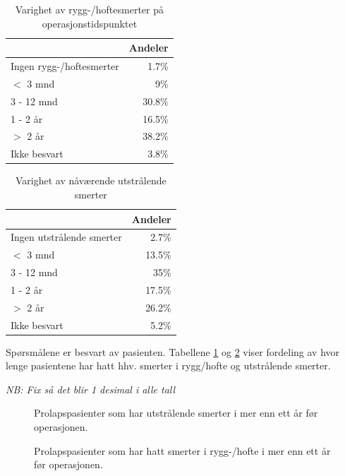 \documentclass [norsk,a4paper,twoside]{article}\usepackage[]{graphicx}\usepackage[]{color}
\begin{document}
\begin{table}[ht]
\centering
\begin{tabular}{lr}
  \hline
 & Andeler \\ 
  \hline
Ingen rygg-/hoftesmerter & 1.7\% \\ 
  $<$ 3 mnd & 9\% \\ 
  3 - 12 mnd & 30.8\% \\ 
  1 - 2 år & 16.5\% \\ 
  $>$ 2 år & 38.2\% \\ 
  Ikke besvart & 3.8\% \\ 
   \hline
\end{tabular}
\caption{Varighet av rygg-/hoftesmerter på operasjonstidspunktet} 
\label{tab:SmRH}
\end{table}
\begin{table}[ht]
\centering
\begin{tabular}{lr}
  \hline
 & Andeler \\ 
  \hline
Ingen utstrålende smerter & 2.7\% \\ 
  $<$ 3 mnd & 13.5\% \\ 
  3 - 12 mnd & 35\% \\ 
  1 - 2 år & 17.5\% \\ 
  $>$ 2 år & 26.2\% \\ 
  Ikke besvart & 5.2\% \\ 
   \hline
\end{tabular}
\caption{Varighet av nåværende utstrålende smerter} 
\label{tab:Utstr}
\end{table}

Spørsmålene er besvart av pasienten.
Tabellene \ref{tab:SmRH}  og \ref{tab:Utstr} viser fordeling av hvor lenge pasientene har hatt 
hhv. smerter i rygg/hofte og utstrålende smerter.

\textit{NB: Fix så det blir 1 desimal i alle tall}



\begin{figure}[h] 
  \caption{Prolapspasienter som har utstrålende smerter
			i mer enn ett år før operasjonen.}
  \label{fig:VarighSmerteUtstrAvd}
\end{figure}

\begin{figure}[h] 
  \caption{Prolapspasienter som har hatt smerter i rygg-/hofte
			i mer enn ett år før operasjonen.}
  \label{fig:VarighSmerteRyggAvd}
\end{figure}
\end{document}
